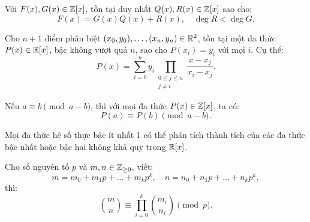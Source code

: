 \documentclass[../imo-training-open-book.tex]{subfiles}
\begin{document}
\vspace{1em}

\begin{theorem}
    \label{theorem:polynomial-division}
    Với \( F(x), G(x) \in \mathbb Z[x] \), tồn tại duy nhất \( Q(x), R(x) \in \mathbb Z[x] \) sao cho:
    \[
        F(x) = G(x) Q(x) + R(x),\quad \deg R < \deg G.
    \]
\end{theorem}

\vspace{1em}

\begin{theorem}
    \label{theorem:lagrange-interpolation}
    Cho \( n+1 \) điểm phân biệt \( (x_0, y_0), \ldots, (x_n, y_n) \in \mathbb R^2 \), tồn tại một đa thức \( P(x) \in \mathbb R[x] \), bậc không vượt quá \( n \), sao cho \( P(x_i) = y_i \) với mọi \( i \). Cụ thể:
    \[
        P(x) = \sum_{i=0}^n y_i \prod_{\substack{0 \le j \le n \\ j \ne i}} \frac{x - x_j}{x_i - x_j}.
    \]
\end{theorem}

\vspace{1em}

\begin{lemma}
    \label{lemma:polynomial-difference-congruence}
    Nếu \( a \equiv b \pmod{a - b} \), thì với mọi đa thức \( P(x) \in \mathbb Z[x] \), ta có:
    \[
        P(a) \equiv P(b) \pmod{a - b}.
    \]
\end{lemma}

\vspace{1em}

\begin{theorem}
    \label{theorem:fundamental-theorem-of-algebra}
    Mọi đa thức hệ số thực bậc ít nhất 1 có thể phân tích thành tích của các đa thức bậc nhất hoặc bậc hai không khả quy trong \( \mathbb R[x] \).
\end{theorem}

\vspace{1em}

\begin{theorem}
    \label{theorem:lucas-theorem}
    Cho số nguyên tố \( p \) và \( m, n \in \mathbb Z_{\ge 0} \), viết:
    \[
        m = m_0 + m_1p + \dots + m_kp^k,\quad n = n_0 + n_1p + \dots + n_kp^k,
    \]
    thì:
    \[
        \binom{m}{n} \equiv \prod_{i=0}^k \binom{m_i}{n_i} \pmod{p}.
    \]
\end{theorem}
\end{document}
